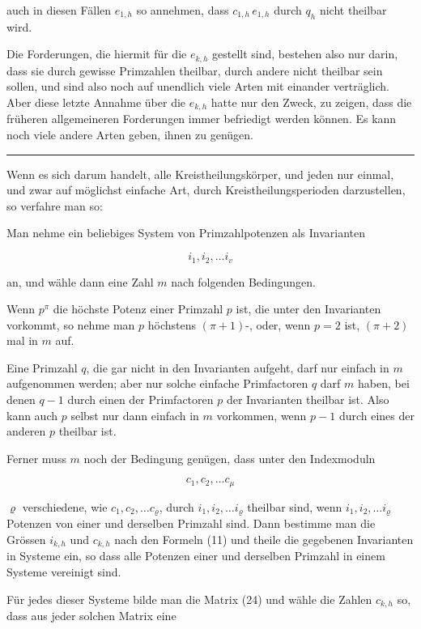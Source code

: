 
auch in diesen F\"allen $e_{1,h}$ so annehmen, dass $c_{1,h}\,e_{1,h}$
durch $q_h$ nicht theilbar wird.

Die Forderungen, die hiermit f\"ur die $e_{k,h}$ gestellt sind, bestehen
also nur darin, dass sie durch gewisse Primzahlen theilbar, durch andere
nicht theilbar sein sollen, und sind also noch auf unendlich viele Arten
mit einander vertr\"aglich. Aber diese letzte Annahme \"uber die $e_{k,h}$
hatte nur den Zweck, zu zeigen, dass die fr\"uheren allgemeineren
Forderungen immer befriedigt werden k\"onnen. Es kann noch viele andere
Arten geben, ihnen zu gen\"ugen.

\noindent\rule{4cm}{0.4pt}

\begin{center}
\end{center}

Wenn es sich darum handelt, alle Kreistheilungsk\"orper, und jeden nur
einmal, und zwar auf m\"oglichst einfache Art, durch
Kreistheilungsperioden darzustellen, so verfahre man so:

Man nehme ein beliebiges System von Primzahlpotenzen als Invarianten

\[
i_1, i_2, \dots i_v
\]

an, und w\"ahle dann eine Zahl $m$ nach folgenden Bedingungen.

Wenn $p^\pi$ die h\"ochste Potenz einer Primzahl $p$ ist, die unter den
Invarianten vorkommt, so nehme man $p$ h\"ochstens $(\pi+1)$-, oder,
wenn $p = 2$ ist, $(\pi+2)$ mal in $m$ auf.

Eine Primzahl $q$, die gar nicht in den Invarianten aufgeht, darf nur
einfach in $m$ aufgenommen werden; aber nur solche einfache Primfactoren
$q$ darf $m$ haben, bei denen $q - 1$ durch einen der Primfactoren $p$
der Invarianten theilbar ist. Also kann auch $p$ selbst nur dann einfach
in $m$ vorkommen, wenn $p - 1$ durch eines der anderen $p$ theilbar ist.

Ferner muss $m$ noch der Bedingung gen\"ugen, dass unter den
Indexmoduln

\[
c_1, c_2, \dots c_\mu
\]

$\varrho$ verschiedene, wie $c_1, c_2, \dots c_\varrho$, durch $i_1, i_2,
\dots i_\varrho$ theilbar sind, wenn $i_1, i_2, \dots i_\varrho$ Potenzen
von einer und derselben Primzahl sind. Dann bestimme man die Gr\"ossen
$i_{k,h}$ und $c_{k,h}$ nach den Formeln (11) und theile die gegebenen
Invarianten in Systeme ein, so dass alle Potenzen einer und derselben
Primzahl in einem Systeme vereinigt sind.

F\"ur jedes dieser Systeme bilde man die Matrix (24) und w\"ahle die
Zahlen $c_{k,h}$ so, dass aus jeder solchen Matrix eine
